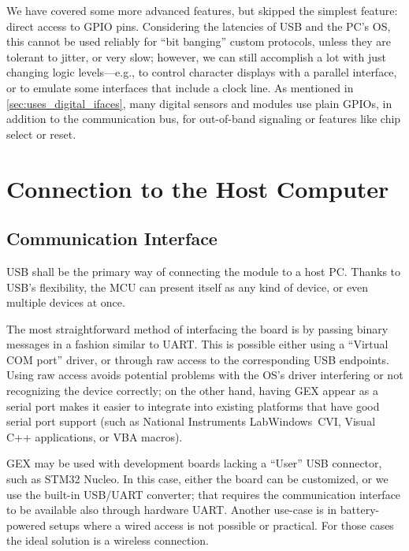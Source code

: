 We have covered some more advanced features, but skipped the simplest feature: direct access to \gls{GPIO} pins. Considering the latencies of \gls{USB} and the \gls{PC}'s \gls{OS}, this cannot be used reliably for ``bit banging'' custom protocols, unless they are tolerant to jitter, or very slow; however, we can still accomplish a lot with just changing logic levels---e.g., to control character displays with a parallel interface, or to emulate some interfaces that include a clock line. As mentioned in \cref{sec:uses_digital_ifaces}, many digital sensors and modules use plain \glspl{GPIO}, in addition to the communication bus, for out-of-band signaling or features like chip select or reset.

\section{Connection to the Host Computer}

\subsection{Communication Interface}

\gls{USB} shall be the primary way of connecting the module to a host \gls{PC}. Thanks to \gls{USB}'s flexibility, the \gls{MCU} can present itself as any kind of device, or even multiple devices at once.

The most straightforward method of interfacing the board is by passing binary messages in a fashion similar to \gls{UART}. This is possible either using a ``Virtual COM port'' driver, or through raw access to the corresponding \gls{USB} endpoints. Using raw access avoids potential problems with the \gls{OS}'s driver interfering or not recognizing the device correctly; on the other hand, having GEX appear as a serial port makes it easier to integrate into existing platforms that have good serial port support (such as National Instruments LabWindows~CVI, Visual C++ applications, or VBA macros).

GEX may be used with development boards lacking a ``User'' \gls{USB} connector, such as STM32 Nucleo. In this case, either the board can be customized, or we use the built-in \gls{USB}/\gls{UART} converter; that requires the communication interface to be available also through hardware \gls{UART}. Another use-case is in battery-powered setups where a wired access is not possible or practical. For those cases the ideal solution is a wireless connection.

